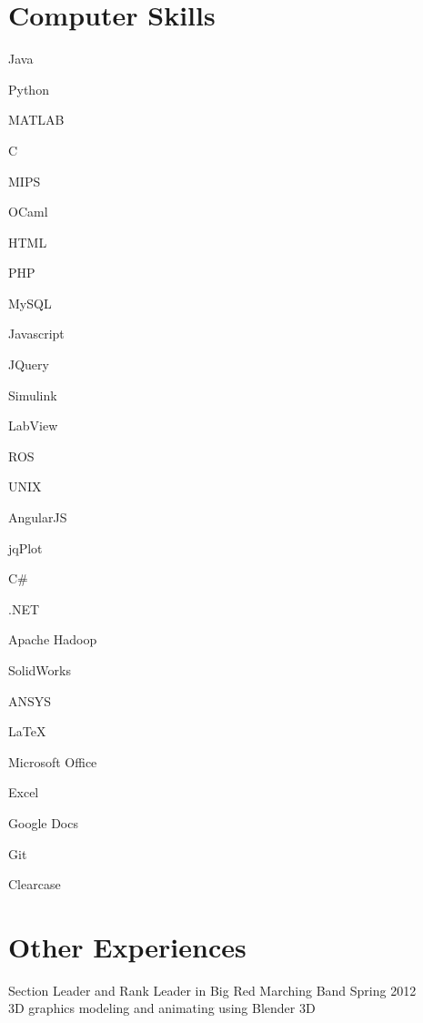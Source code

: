 \documentclass{BradyResume}
\begin{document}
\section*{Computer Skills}
\begin{pipelist}[Programming]
    \item Java
    \item Python
    \item MATLAB
    \item C
    \item MIPS
    \item OCaml
    \item HTML
    \item PHP
    \item MySQL
    \item Javascript
    \item JQuery
    \item Simulink 
    \item LabView
    \item ROS
    \item UNIX
    \item AngularJS
    \item jqPlot
    \item C\#
    \item .NET
    \item Apache Hadoop
\end{pipelist}

\begin{pipelist}
    \item SolidWorks
    \item ANSYS
\end{pipelist}

\begin{pipelist}[Other]
    \item \LaTeX\ 
    \item Microsoft Office
    \item Excel
    \item Google Docs
    \item Git
    \item Clearcase
\end{pipelist}

\section*{Other Experiences}
Section Leader and Rank Leader in Big Red Marching Band \dotfill Spring 2012\\
3D graphics modeling and animating using Blender 3D
\end{document}
